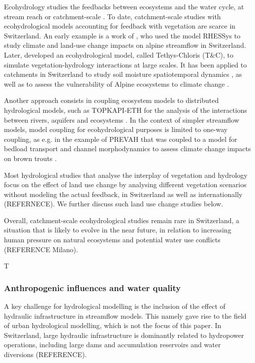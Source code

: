 \documentclass[10pt,a4paper]{article}
\begin{document}
Ecohydrology studies the feedbacks between ecosystems and the water cycle, at stream reach or catchment-scale \citep{Tague2020}. To date, catchment-scale studies with ecohydrological models accounting for feedback with vegetation are scarce in Switzerland. An early example is a work of \citet{Zierl2005}, who used the model RHESSys to study climate and land-use change impacts on alpine streamflow in Switzerland. Later, \citet{Fatichi2012, Fatichi2012a} developed an ecohydrological model, called Tethys-Chloris (T\&C), to simulate vegetation-hydrology interactions at large scales. It has been applied to catchments in Switzerland to study soil moisture spatiotemporal dynamics \citep{Fatichi2015a}, as well as to assess the vulnerability of Alpine ecosystems to climate change \citep{Mastrotheodoros2019}.

Another approach consists in coupling ecosystem models to distributed hydrological models, such as TOPKAPI-ETH for the analysis of the interactions between rivers, aquifers and ecosystems \citep{Foglia2009, Pappas2015}. In the context of simpler streamflow models, model coupling for ecohydrological purposes is limited to one-way coupling, as e.g. in the example of PREVAH that was coupled to a model for bedload transport and channel morphodynamics to assess climate change impacts on brown trouts \citep{Junker2015}. 

Most hydrological studies that analyse the interplay of vegetation and hydrology focus on the effect of land use change by analysing different vegetation scenarios without modeling the actual feedback, in Switzerland as well as internationally (REFERNECE). We further discuss such land use change studies below. 

Overall, catchment-scale ecohydrological studies remain rare in Switzerland, a situation that is likely to evolve in the near future, in relation to increasing human pressure on natural ecosystems and potential water use conflicts (REFERENCE Milano).

T%


\subsubsection{Anthropogenic influences and water quality}
\label{sec:context:infrastructures}
A key challenge for hydrological modelling is the inclusion of the effect of hydraulic infrastructure in streamflow models. This namely gave rise to the field of urban hydrological modelling, which is not the focus of this paper.  In Switzerland, large hydraulic infrastructure is dominantly related to hydropower operations, including large dams and accumulation reservoirs and water diversions (REFERENCE).
\end{document}
